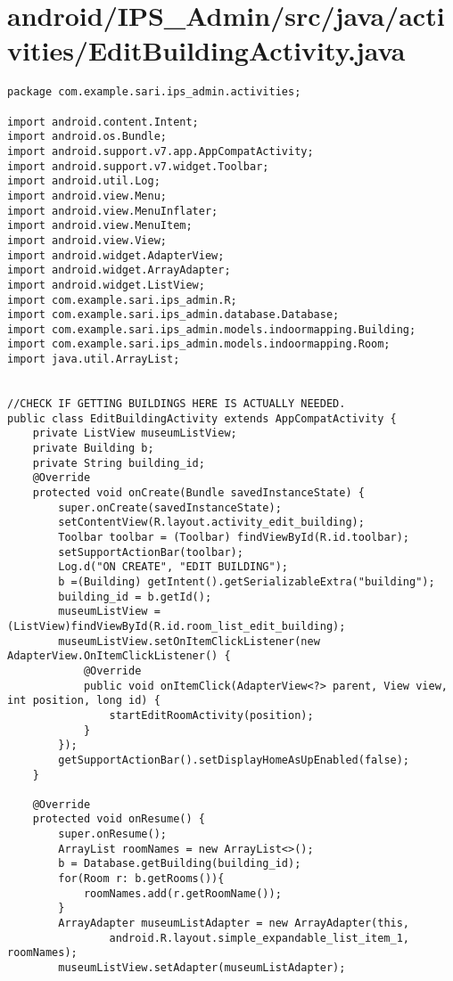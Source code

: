 \section{android/IPS\_Admin/src/java/activities/EditBuildingActivity.java}
\begin{lstlisting}package com.example.sari.ips_admin.activities;

import android.content.Intent;
import android.os.Bundle;
import android.support.v7.app.AppCompatActivity;
import android.support.v7.widget.Toolbar;
import android.util.Log;
import android.view.Menu;
import android.view.MenuInflater;
import android.view.MenuItem;
import android.view.View;
import android.widget.AdapterView;
import android.widget.ArrayAdapter;
import android.widget.ListView;
import com.example.sari.ips_admin.R;
import com.example.sari.ips_admin.database.Database;
import com.example.sari.ips_admin.models.indoormapping.Building;
import com.example.sari.ips_admin.models.indoormapping.Room;
import java.util.ArrayList;


//CHECK IF GETTING BUILDINGS HERE IS ACTUALLY NEEDED.
public class EditBuildingActivity extends AppCompatActivity {
    private ListView museumListView;
    private Building b;
    private String building_id;
    @Override
    protected void onCreate(Bundle savedInstanceState) {
        super.onCreate(savedInstanceState);
        setContentView(R.layout.activity_edit_building);
        Toolbar toolbar = (Toolbar) findViewById(R.id.toolbar);
        setSupportActionBar(toolbar);
        Log.d("ON CREATE", "EDIT BUILDING");
        b =(Building) getIntent().getSerializableExtra("building");
        building_id = b.getId();
        museumListView = (ListView)findViewById(R.id.room_list_edit_building);
        museumListView.setOnItemClickListener(new AdapterView.OnItemClickListener() {
            @Override
            public void onItemClick(AdapterView<?> parent, View view, int position, long id) {
                startEditRoomActivity(position);
            }
        });
        getSupportActionBar().setDisplayHomeAsUpEnabled(false);
    }

    @Override
    protected void onResume() {
        super.onResume();
        ArrayList roomNames = new ArrayList<>();
        b = Database.getBuilding(building_id);
        for(Room r: b.getRooms()){
            roomNames.add(r.getRoomName());
        }
        ArrayAdapter museumListAdapter = new ArrayAdapter(this,
                android.R.layout.simple_expandable_list_item_1, roomNames);
        museumListView.setAdapter(museumListAdapter);


\end{lstlisting}
